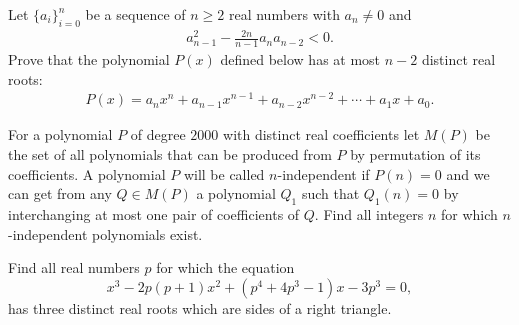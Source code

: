 \begin{question}
    Let $\{a_i\}_{i=0}^{n}$ be a sequence of $n\geq 2$ real numbers with $a_n \neq 0$ and
    \begin{align*}
        a_{n-1}^2 - \frac{2n}{n-1}a_na_{n-2} < 0.
    \end{align*}
    Prove that the polynomial $P(x)$ defined below has at most $n-2$ distinct real roots:
    \begin{align*}
        P(x) = a_nx^n + a_{n-1}x^{n-1} + a_{n-2}x^{n-2} + \cdots + a_1 x + a_0.
    \end{align*}
\end{question}

\begin{question}[name={2000 IMO Shortlist}] 
    For a polynomial $ P$ of degree $2000$ with distinct real coefficients let $ M(P)$ be the set of all polynomials that can be produced from $ P$ by permutation of its coefficients. A polynomial $ P$ will be called $ n$-independent if $ P(n) = 0$ and we can get from any $ Q \in M(P)$ a polynomial $ Q_1$ such that $ Q_1(n) = 0$ by interchanging at most one pair of coefficients of $ Q.$ Find all integers $ n$ for which $ n$-independent polynomials exist.
\end{question}

\begin{question}[name={1995 Czech And Slovak Mathematical Olympiad}] 
    Find all real numbers $p$ for which the equation \[x^3 -2p(p+1)x^2+(p^4 +4p^3 -1)x-3p^3 = 0,\] has three distinct real roots which are sides of a right triangle.
\end{question}


